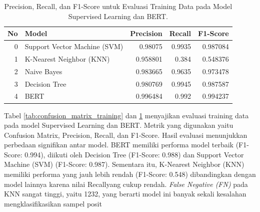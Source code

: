 \documentclass{article}\usepackage{float}
\begin{document}
\begin{table}[h!]
\centering
\begin{tabular}{r|l|r|r|r}
\toprule
No & Model                        & Precision & Recall & F1-Score \\ \midrule
0  & Support Vector Machine (SVM) & 0.98075   & 0.9935 & 0.987084 \\
1  & K-Nearest Neighbor (KNN)     & 0.958801  & 0.384  & 0.548376 \\
2  & Naive Bayes                  & 0.983665  & 0.9635 & 0.973478 \\
3  & Decision Tree                & 0.980769  & 0.9945 & 0.987587 \\
4  & BERT                         & 0.996484  & 0.992  & 0.994237 \\ \bottomrule
\end{tabular}
\caption{\label{tab:metrics_training} Precision, Recall, dan F1-Score untuk Evaluasi Training Data pada Model Supervised Learning dan BERT.}
\end{table}

Tabel \ref{tab:confusion_matrix_training} dan \ref{tab:metrics_training} menyajikan evaluasi training data pada model Supervised Learning dan BERT. Metrik yang digunakan yaitu Confusion Matrix, Precision, Recall, dan F1-Score. Hasil evaluasi menunjukkan perbedaan signifikan antar model. BERT memiliki performa model terbaik (F1-Score: 0.994), diikuti oleh Decision Tree (F1-Score: 0.988) dan Support Vector Machine (SVM) (F1-Score: 0.987). Sementara itu, K-Nearest Neighbor (KNN) memiliki performa yang jauh lebih rendah (F1-Score: 0.548) dibandingkan dengan model lainnya karena nilai Recallyang cukup rendah. \textit{False Negative (FN)} pada KNN sangat tinggi, yaitu 1232, yang berarti model ini banyak sekali kesalahan mengklasifikasikan sampel posit
\end{document}
